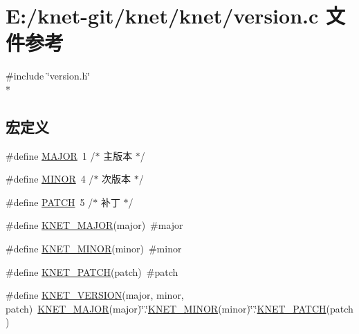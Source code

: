 \hypertarget{a00101}{}\section{E\+:/knet-\/git/knet/knet/version.c 文件参考}
\label{a00101}
{\ttfamily \#include \char`\"{}version.\+h\char`\"{}}\\*
\subsection*{宏定义}
\begin{DoxyCompactItemize}
\item 
\#define \hyperlink{a00101_a877cce34f3e58fd7f9194fab90724cb8_a877cce34f3e58fd7f9194fab90724cb8}{M\+A\+J\+O\+R}~1 /$\ast$ 主版本 $\ast$/
\item 
\#define \hyperlink{a00101_a4e10915d93013542d442d78de0e02e9a_a4e10915d93013542d442d78de0e02e9a}{M\+I\+N\+O\+R}~4 /$\ast$ 次版本 $\ast$/
\item 
\#define \hyperlink{a00101_af59c44c1f3ff875c35393428624473aa_af59c44c1f3ff875c35393428624473aa}{P\+A\+T\+C\+H}~5 /$\ast$ 补丁 $\ast$/
\item 
\#define \hyperlink{a00101_ad4c134c968cc4fc0cc700567eb39c675_ad4c134c968cc4fc0cc700567eb39c675}{K\+N\+E\+T\+\_\+\+M\+A\+J\+O\+R}(major)~\#major
\item 
\#define \hyperlink{a00101_a70224fafcaea5102f9cd726ba926684f_a70224fafcaea5102f9cd726ba926684f}{K\+N\+E\+T\+\_\+\+M\+I\+N\+O\+R}(minor)~\#minor
\item 
\#define \hyperlink{a00101_ae9af7a95a483a187a37d3e9828c6ac1c_ae9af7a95a483a187a37d3e9828c6ac1c}{K\+N\+E\+T\+\_\+\+P\+A\+T\+C\+H}(patch)~\#patch
\item 
\#define \hyperlink{a00101_a96eb274e34ccfa0c0505ca99f2e09a82_a96eb274e34ccfa0c0505ca99f2e09a82}{K\+N\+E\+T\+\_\+\+V\+E\+R\+S\+I\+O\+N}(major,  minor,  patch)~\hyperlink{a00101_ad4c134c968cc4fc0cc700567eb39c675_ad4c134c968cc4fc0cc700567eb39c675}{K\+N\+E\+T\+\_\+\+M\+A\+J\+O\+R}(major)\char`\"{}.\char`\"{}\hyperlink{a00101_a70224fafcaea5102f9cd726ba926684f_a70224fafcaea5102f9cd726ba926684f}{K\+N\+E\+T\+\_\+\+M\+I\+N\+O\+R}(minor)\char`\"{}.\char`\"{}\hyperlink{a00101_ae9af7a95a483a187a37d3e9828c6ac1c_ae9af7a95a483a187a37d3e9828c6ac1c}{K\+N\+E\+T\+\_\+\+P\+A\+T\+C\+H}(patch)
\end{DoxyCompactItemize}
